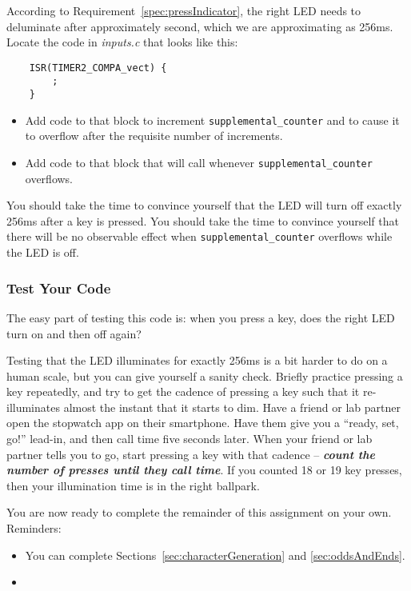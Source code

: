 According to Requirement~\ref{spec:pressIndicator}, the right LED needs to deluminate after approximately \textonequarter second, which we are approximating as 256ms.
Locate the code in \textit{inputs.c} that looks like this:

\begin{lstlisting}
    ISR(TIMER2_COMPA_vect) {
        ;
    }
\end{lstlisting}

\begin{itemize}
    \item Add code to that block to increment \lstinline{supplemental_counter} and to cause it to overflow after the requisite number of increments.
    \item Add code to that block that will call  whenever \lstinline{supplemental_counter} overflows.
\end{itemize}

You should take the time to convince yourself that the LED will turn off exactly 256ms after a key is pressed.
You should take the time to convince yourself that there will be no observable effect when \lstinline{supplemental_counter} overflows while the LED is off.


\subsubsection{Test Your Code}

The easy part of testing this code is: when you press a key, does the right LED turn on and then off again?

Testing that the LED illuminates for exactly 256ms is a bit harder to do on a human scale, but you can give yourself a sanity check.
Briefly practice pressing a key repeatedly, and try to get the cadence of pressing a key such that it re-illuminates almost the instant that it starts to dim.
Have a friend or lab partner open the stopwatch app on their smartphone.
Have them give you a ``ready, set, go!'' lead-in, and then call time five seconds later.
When your friend or lab partner tells you to go, start pressing a key with that cadence -- \textbf{\textit{count the number of presses until they call time}}.
If you counted 18 or 19 key presses, then your illumination time is in the right ballpark.

\vspace{1cm}

You are now ready to complete the remainder of this assignment on your own.
Reminders:
\begin{itemize}
    \item You can complete Sections~\ref{sec:characterGeneration} and \ref{sec:oddsAndEnds}.
    \item \collaborationrules
\end{itemize}

